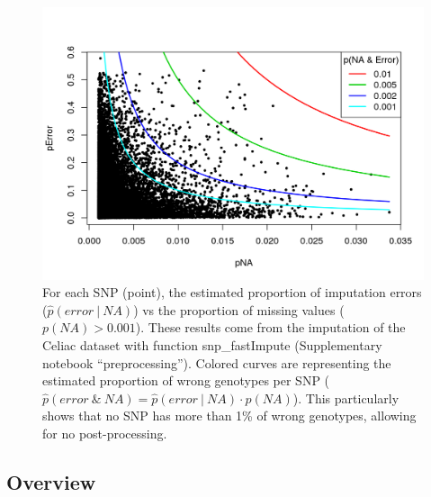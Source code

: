 \documentclass[a4paper, 11pt]{article}
\begin{document}
\begin{figure}[!h]
\centerline{\includegraphics[width=\textwidth]{post-imputation}}
\caption{For each SNP (point), the estimated proportion of imputation errors ($\hat{p}(error~|~NA)$) vs the proportion of missing values ($p(NA) > 0.001$).
These results come from the imputation of the Celiac dataset with function snp\_fastImpute (Supplementary notebook ``preprocessing''). 
Colored curves are representing the estimated proportion of wrong genotypes per SNP ($\hat{p}(error~\&~NA) = \hat{p}(error~|~NA) \cdot p(NA)$). This particularly shows that no SNP has more than 1\% of wrong genotypes, allowing for no post-processing.}\label{fig:post-imputation}
\end{figure}

\clearpage
\subsection{Overview}
\end{document}
